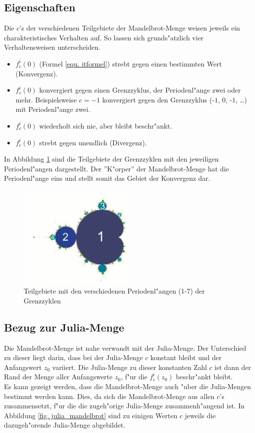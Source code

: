 \begin{refsection}
		
	\subsection{Eigenschaften}
		Die $c$'s der verschiedenen Teilgebiete der Mandelbrot-Menge weisen jeweils ein charakteristisches Verhalten auf. So lassen sich grunds"atzlich vier Verhaltensweisen unterscheiden.
		\begin{itemize}
			\item $f_c^i(0)$ (Formel \ref{equ. itformel}) strebt gegen einen bestimmten Wert (Konvergenz).
			\item $f_c^i(0)$ konvergiert gegen einen Grenzzyklus, der Periodenl"ange zwei oder mehr. Beispielsweise $c=-1$ konvergiert gegen den Grenzzyklus (-$1$, $0$, -$1$, \dots) mit Periodenl"ange zwei.
			\item $f_c^i(0)$ wiederholt sich nie, aber bleibt beschr"ankt.
			\item $f_c^i(0)$ strebt gegen unendlich (Divergenz).
		\end{itemize}
		In Abbildung \ref{fig. grenzzyklen} sind die Teilgebiete der Grenzzyklen mit den jeweiligen Periodenl"angen dargestellt. Der ''K"orper'' der Mandelbrot-Menge hat die Periodenl"ange eins und stellt somit das Gebiet der Konvergenz dar. \cite{wiki} \\[-0.8cm]
		\begin{figure}[ht!]\centering
			\includegraphics[width=0.5\textwidth]{apfel/pic/perioden_mandelbrotmenge.png}
			\caption{Teilgebiete mit den verschiedenen Periodenl"angen (1-7) der Grenzzyklen \cite{wikiBild}}
			\label{fig. grenzzyklen}
		\end{figure}

	\subsection{Bezug zur Julia-Menge}
		Die Mandelbrot-Menge ist nahe verwandt mit der Julia-Menge. Der Unterschied zu dieser liegt darin, dass bei der Julia-Menge $c$ konstant bleibt und der Anfangswert $z_0$ variiert. Die Julia-Menge zu dieser konstanten Zahl $c$ ist dann der Rand der Menge aller Anfangswerte $z_0$, f"ur die $f_c^i(z_0)$ beschr"ankt bleibt.\\[0.3cm]
		Es kann gezeigt werden, dass die Mandelbrot-Menge auch "uber die Julia-Mengen bestimmt werden kann. Dies, da sich die Mandelbrot-Menge aus allen $c$'s zusammensetzt, f"ur die die zugeh"orige Julia-Menge zusammenh"angend ist. In Abbildung \ref{fig. julia_mandelbrot} sind zu einigen Werten $c$ jeweils die dazugeh"orende Julia-Menge abgebildet. \cite{wiki}
		

\end{refsection}
